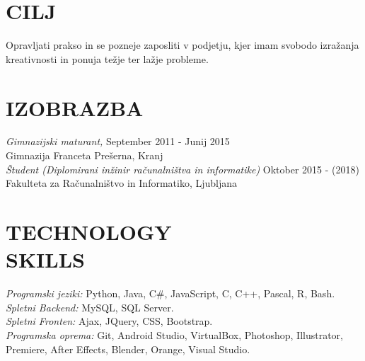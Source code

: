 \documentclass[margin, 10pt]{res} %
\begin{document}
\begin{resume}

 
\section{CILJ}  
Opravljati prakso in se pozneje zaposliti v podjetju, kjer imam svobodo izražanja kreativnosti in ponuja težje ter lažje probleme.

\section{IZOBRAZBA}

{\sl Gimnazijski maturant,}  \hfill September 2011 - Junij 2015 \\
Gimnazija Franceta Prešerna, Kranj\\
{\sl Študent (Diplomirani inžinir računalništva in informatike)}  \hfill Oktober 2015 - (2018)\\
Fakulteta za Računalništvo in Informatiko, Ljubljana

\section{TECHNOLOGY \\ SKILLS} 

{\sl Programski jeziki:} Python, Java, C\#, JavaScript,  C, C++, Pascal, R, Bash. \\
{\sl Spletni Backend:} MySQL, SQL Server.\\
{\sl Spletni Fronten:} Ajax, JQuery, CSS, Bootstrap. \\
{\sl Programska oprema:} Git,  Android Studio, VirtualBox, Photoshop, Illustrator, Premiere, After Effects, Blender, Orange, Visual Studio.
 
 

\end{resume}
\end{document}
